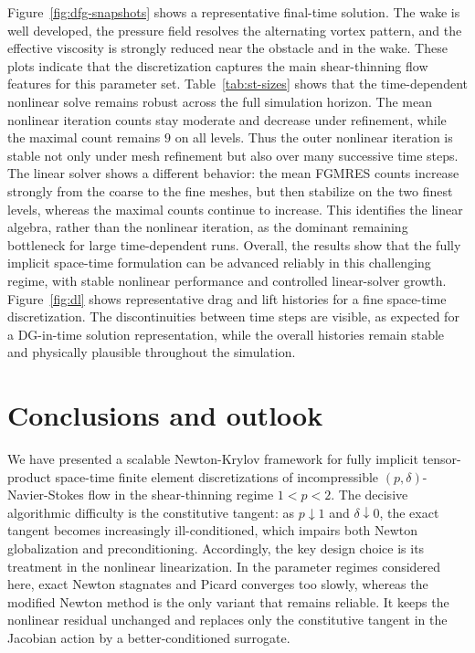 \documentclass[DIV=16]{scrartcl}
\newcommand{\reg}{\delta}
\newcommand{\pn}{p}
\begin{document}
Figure~\ref{fig:dfg-snapshots} shows a representative final-time solution. The wake
is well developed, the pressure field resolves the alternating vortex pattern,
and the effective viscosity is strongly reduced near the obstacle and in the
wake. These plots indicate that the discretization captures the main
shear-thinning flow features for this parameter set. Table~\ref{tab:st-sizes} shows that the time-dependent nonlinear solve remains robust across the full simulation horizon. The mean nonlinear iteration counts stay moderate and decrease under refinement, while the maximal count remains \(9\) on all levels. Thus the outer nonlinear iteration is stable not only under mesh refinement but also over many successive time steps. The linear solver shows a different behavior: the mean FGMRES counts increase strongly from the coarse to the fine meshes, but then stabilize on the two finest levels, whereas the maximal counts continue to increase. This identifies the linear algebra, rather than the nonlinear iteration, as the dominant remaining bottleneck for large time-dependent runs. Overall, the results show that the fully implicit space-time formulation can be advanced reliably in this challenging regime, with stable nonlinear performance and controlled linear-solver growth. Figure~\ref{fig:dl} shows representative drag and lift histories for a fine space-time discretization. The discontinuities between time steps are visible, as expected for a DG-in-time solution representation, while the overall histories remain stable and physically plausible throughout the simulation.

\FloatBarrier
\section{Conclusions and outlook}
\label{sec:conclusions}
We have presented a scalable Newton-Krylov framework for fully implicit
tensor-product space-time finite element discretizations of incompressible
$(\pn,\reg)$-Navier-Stokes flow in the shear-thinning regime $1<\pn<2$. The
decisive algorithmic difficulty is the constitutive tangent: as $\pn\downarrow
1$ and $\reg\downarrow 0$, the exact tangent becomes increasingly
ill-conditioned, which impairs both Newton globalization and preconditioning.
Accordingly, the key design choice is its treatment in the nonlinear
linearization. In the parameter regimes considered here, exact Newton
stagnates and Picard converges too slowly, whereas the modified Newton method
is the only variant that remains reliable. It keeps the nonlinear residual
unchanged and replaces only the constitutive tangent in the Jacobian action by
a better-conditioned surrogate.
\end{document}
